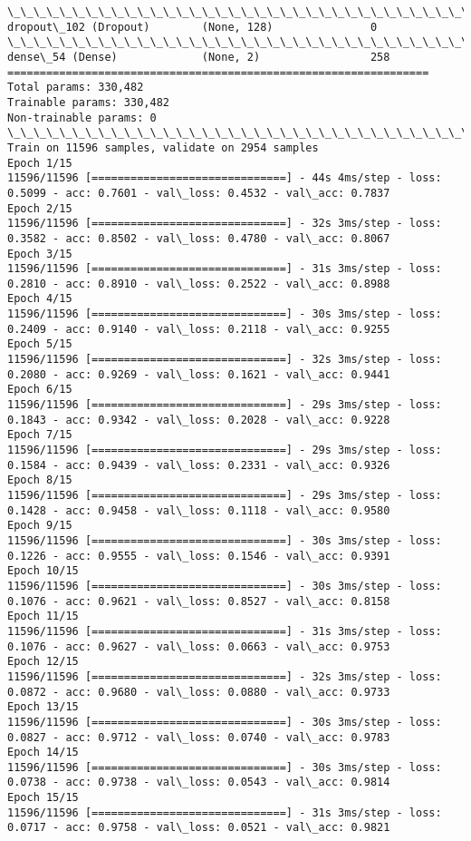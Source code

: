 \documentclass[11pt]{article}
\begin{document}
\begin{Verbatim}[commandchars=\\\{\}]
\_\_\_\_\_\_\_\_\_\_\_\_\_\_\_\_\_\_\_\_\_\_\_\_\_\_\_\_\_\_\_\_\_\_\_\_\_\_\_\_\_\_\_\_\_\_\_\_\_\_\_\_\_\_\_\_\_\_\_\_\_\_\_\_\_
dropout\_102 (Dropout)        (None, 128)               0         
\_\_\_\_\_\_\_\_\_\_\_\_\_\_\_\_\_\_\_\_\_\_\_\_\_\_\_\_\_\_\_\_\_\_\_\_\_\_\_\_\_\_\_\_\_\_\_\_\_\_\_\_\_\_\_\_\_\_\_\_\_\_\_\_\_
dense\_54 (Dense)             (None, 2)                 258       
=================================================================
Total params: 330,482
Trainable params: 330,482
Non-trainable params: 0
\_\_\_\_\_\_\_\_\_\_\_\_\_\_\_\_\_\_\_\_\_\_\_\_\_\_\_\_\_\_\_\_\_\_\_\_\_\_\_\_\_\_\_\_\_\_\_\_\_\_\_\_\_\_\_\_\_\_\_\_\_\_\_\_\_
Train on 11596 samples, validate on 2954 samples
Epoch 1/15
11596/11596 [==============================] - 44s 4ms/step - loss: 0.5099 - acc: 0.7601 - val\_loss: 0.4532 - val\_acc: 0.7837
Epoch 2/15
11596/11596 [==============================] - 32s 3ms/step - loss: 0.3582 - acc: 0.8502 - val\_loss: 0.4780 - val\_acc: 0.8067
Epoch 3/15
11596/11596 [==============================] - 31s 3ms/step - loss: 0.2810 - acc: 0.8910 - val\_loss: 0.2522 - val\_acc: 0.8988
Epoch 4/15
11596/11596 [==============================] - 30s 3ms/step - loss: 0.2409 - acc: 0.9140 - val\_loss: 0.2118 - val\_acc: 0.9255
Epoch 5/15
11596/11596 [==============================] - 32s 3ms/step - loss: 0.2080 - acc: 0.9269 - val\_loss: 0.1621 - val\_acc: 0.9441
Epoch 6/15
11596/11596 [==============================] - 29s 3ms/step - loss: 0.1843 - acc: 0.9342 - val\_loss: 0.2028 - val\_acc: 0.9228
Epoch 7/15
11596/11596 [==============================] - 29s 3ms/step - loss: 0.1584 - acc: 0.9439 - val\_loss: 0.2331 - val\_acc: 0.9326
Epoch 8/15
11596/11596 [==============================] - 29s 3ms/step - loss: 0.1428 - acc: 0.9458 - val\_loss: 0.1118 - val\_acc: 0.9580
Epoch 9/15
11596/11596 [==============================] - 30s 3ms/step - loss: 0.1226 - acc: 0.9555 - val\_loss: 0.1546 - val\_acc: 0.9391
Epoch 10/15
11596/11596 [==============================] - 30s 3ms/step - loss: 0.1076 - acc: 0.9621 - val\_loss: 0.8527 - val\_acc: 0.8158
Epoch 11/15
11596/11596 [==============================] - 31s 3ms/step - loss: 0.1076 - acc: 0.9627 - val\_loss: 0.0663 - val\_acc: 0.9753
Epoch 12/15
11596/11596 [==============================] - 32s 3ms/step - loss: 0.0872 - acc: 0.9680 - val\_loss: 0.0880 - val\_acc: 0.9733
Epoch 13/15
11596/11596 [==============================] - 30s 3ms/step - loss: 0.0827 - acc: 0.9712 - val\_loss: 0.0740 - val\_acc: 0.9783
Epoch 14/15
11596/11596 [==============================] - 30s 3ms/step - loss: 0.0738 - acc: 0.9738 - val\_loss: 0.0543 - val\_acc: 0.9814
Epoch 15/15
11596/11596 [==============================] - 31s 3ms/step - loss: 0.0717 - acc: 0.9758 - val\_loss: 0.0521 - val\_acc: 0.9821

    \end{Verbatim}
\end{document}
